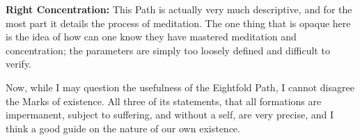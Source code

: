\documentclass[12pt,letterpaper]{article}
\begin{document}
\begin{spacing}{2}
    \textbf{Right Concentration:} This Path is actually very much descriptive,
    and for the most part it details the process of meditation. The one thing
    that is opaque here is the idea of how can one know they have mastered
    meditation and concentration; the parameters are simply too loosely defined
    and difficult to verify.

    Now, while I may question the usefulness of the Eightfold Path, I cannot
    disagree the Marks of existence. All three of its statements, that all
    formations are impermanent, subject to suffering, and without a self, are
    very precise, and I think a good guide on the nature of our own existence.

\end{spacing}
\end{document}
